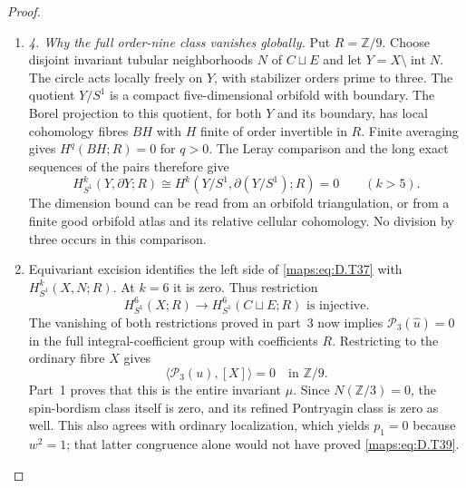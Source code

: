 \begin{proof}
\begin{enumerate}[label=\arabic*.,leftmargin=*]
\item \emph{4. Why the full order-nine class vanishes globally.}
Put $R=\mathbb Z/9$. Choose disjoint invariant tubular neighborhoods
$N$ of $C\sqcup E$ and let $Y=X\setminus\operatorname{int}N$.
The circle acts locally freely on $Y$, with stabilizer orders prime
to three. The quotient $Y/S^1$ is a compact five-dimensional orbifold
with boundary. The Borel projection to this quotient, for both $Y$
and its boundary, has local cohomology fibres $BH$ with $H$ finite
of order invertible in $R$. Finite averaging gives
$H^q(BH;R)=0$ for $q>0$. The Leray comparison and the long exact
sequences of the pairs therefore give
\[
 H^k_{S^1}(Y,\partial Y;R)
             \cong H^k(Y/S^1,\partial(Y/S^1);R)=0
                            \qquad(k>5).                     \tag{D.T37}\label{maps:eq:D.T37}
\]
The dimension bound can be read from an orbifold triangulation,
or from a finite good orbifold atlas and its relative cellular
cohomology. No division by three occurs in this comparison.

\item Equivariant excision identifies the left side of \eqref{maps:eq:D.T37} with
$H^k_{S^1}(X,N;R)$. At $k=6$ it is zero. Thus restriction
\[
 H^6_{S^1}(X;R)\longrightarrow H^6_{S^1}(C\sqcup E;R)
                         \text{ is injective}.               \tag{D.T38}\label{maps:eq:D.T38}
\]
The vanishing of both restrictions proved in part~3 now implies
$\mathcal P_3(\widehat u)=0$ in the full integral-coefficient group
with coefficients $R$. Restricting to the ordinary fibre $X$ gives
\[
                        \langle\mathcal P_3(u),[X]\rangle=0
                                     \quad\text{in }\mathbb Z/9.
                                                               \tag{D.T39}\label{maps:eq:D.T39}
\]
Part~1 proves that this is the entire invariant $\mu$. Since
$N(\mathbb Z/3)=0$, the spin-bordism class itself is zero, and its
refined Pontryagin class is zero as well. This also agrees with
ordinary localization, which yields $p_1=0$ because $w^2=1$;
that latter congruence alone would not have proved \eqref{maps:eq:D.T39}.


\end{enumerate}
\end{proof}
